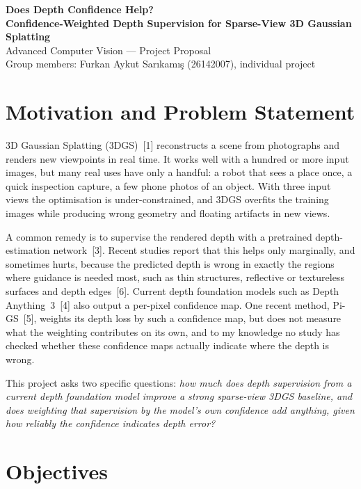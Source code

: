 \documentclass[11pt,a4paper]{article}
\newcommand{\studentname}{Furkan Aykut Sarıkamış}
\newcommand{\studentid}{26142007}
\begin{document}
\begin{center}
{\Large\bfseries Does Depth Confidence Help?\\[0.2em]
Confidence-Weighted Depth Supervision for Sparse-View 3D Gaussian Splatting}\\[0.8em]
Advanced Computer Vision --- Project Proposal\\[0.3em]
Group members: \studentname{} (\studentid), individual project
\end{center}

\section{Motivation and Problem Statement}

3D Gaussian Splatting (3DGS)~[1] reconstructs a scene from photographs and renders new viewpoints in real time. It works well with a hundred or more input images, but many real uses have only a handful: a robot that sees a place once, a quick inspection capture, a few phone photos of an object. With three input views the optimisation is under-constrained, and 3DGS overfits the training images while producing wrong geometry and floating artifacts in new views.

A common remedy is to supervise the rendered depth with a pretrained depth-estimation network~[3]. Recent studies report that this helps only marginally, and sometimes hurts, because the predicted depth is wrong in exactly the regions where guidance is needed most, such as thin structures, reflective or textureless surfaces and depth edges~[6]. Current depth foundation models such as Depth Anything~3~[4] also output a per-pixel confidence map. One recent method, Pi-GS~[5], weights its depth loss by such a confidence map, but does not measure what the weighting contributes on its own, and to my knowledge no study has checked whether these confidence maps actually indicate where the depth is wrong.

This project asks two specific questions: \emph{how much does depth supervision from a current depth foundation model improve a strong sparse-view 3DGS baseline, and does weighting that supervision by the model's own confidence add anything, given how reliably the confidence indicates depth error?}

\section{Objectives}
\end{document}
